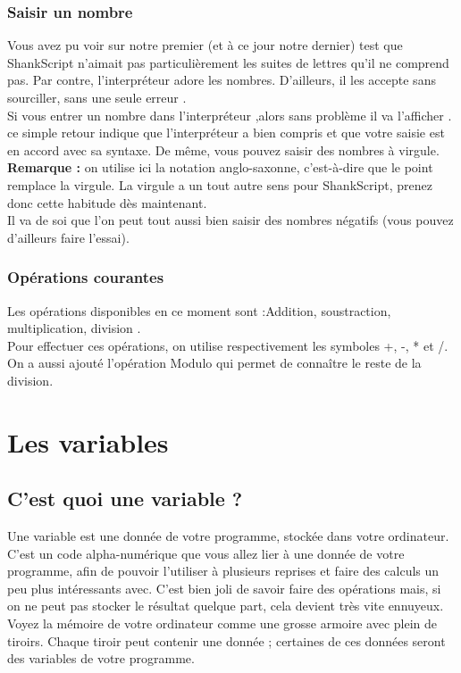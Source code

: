 \subsubsection{Saisir un nombre } 

Vous avez pu voir sur notre premier (et à ce jour notre dernier) test que ShankScript n'aimait pas particulièrement les suites de lettres qu'il ne comprend pas. Par contre, l'interpréteur adore les nombres. D'ailleurs, il les accepte sans sourciller, sans une seule erreur .
\\ Si vous entrer un nombre dans l'interpréteur ,alors sans problème il va l'afficher . ce simple retour indique que l'interpréteur a bien compris et que votre saisie est en accord avec sa syntaxe. De même, vous pouvez saisir des nombres à virgule.
\\[0.5cm]
\textbf{Remarque :} on utilise ici la notation anglo-saxonne, c'est-à-dire que le point remplace la virgule. La virgule a un tout autre sens pour ShankScript, prenez donc cette habitude dès maintenant.
\\[0.5cm]
Il va de soi que l'on peut tout aussi bien saisir des nombres négatifs (vous pouvez d'ailleurs faire l'essai).

\subsubsection{Opérations courantes} 

Les opérations disponibles en ce moment sont :Addition, soustraction, multiplication, division .
\\[0.5cm]
Pour effectuer ces opérations, on utilise respectivement les symboles +, -, * et /. 
\\[0.5cm]
On a aussi ajouté l'opération Modulo qui permet de connaître le reste de la division.


\section{Les variables}

\subsection{C'est quoi une variable ?}

Une variable est une donnée de votre programme, stockée dans votre ordinateur. C'est un code alpha-numérique que vous allez lier à une donnée de votre programme, afin de pouvoir l'utiliser à plusieurs reprises et faire des calculs un peu plus intéressants avec. C'est bien joli de savoir faire des opérations mais, si on ne peut pas stocker le résultat quelque part, cela devient très vite ennuyeux.
\\[0.5cm]
Voyez la mémoire de votre ordinateur comme une grosse armoire avec plein de tiroirs. Chaque tiroir peut contenir une donnée ; certaines de ces données seront des variables de votre programme.

